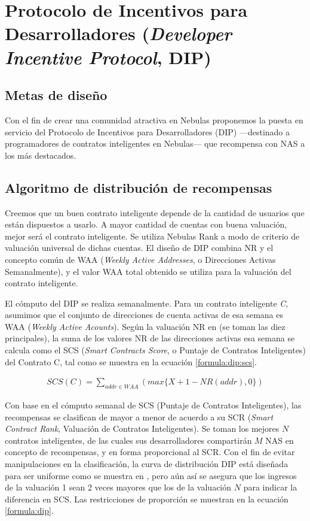 \section{Protocolo de Incentivos para Desarrolladores (\textit{Developer Incentive Protocol}, DIP)}
\label{sec:dip}

\subsection{Metas de diseño}
\label{dip:design}

Con el fin de crear una comunidad atractiva en Nebulas proponemos la puesta en servicio del Protocolo de Incentivos para Desarrolladores (DIP) —destinado a programadores de contratos inteligentes en Nebulas— que recompensa con NAS a los más destacados.

\subsection{Algoritmo de distribución de recompensas}
\label{dip:arith}

Creemos que un buen contrato inteligente depende de la cantidad de usuarios que están dispuestos a usarlo. A mayor cantidad de cuentas con buena valuación, mejor será el contrato inteligente. Se utiliza Nebulas Rank a modo de criterio de valuación universal de dichas cuentas. El diseño de DIP combina NR y el concepto común de WAA (\textit{Weekly Active Addresses}, o Direcciones Activas Semanalmente), y el valor WAA total obtenido se utiliza para la valuación del contrato inteligente.

El cómputo del DIP se realiza semanalmente. Para un contrato inteligente \textit{C}, asumimos que el conjunto de direcciones de cuenta activas de esa semana es WAA (\textit{Weekly Active Acounts}). Según la valuación NR en  (se toman las diez principales), la suma de los valores NR de las direcciones activas esa semana se calcula como el SCS (\textit{Smart Contracts Score}, o Puntaje de Contratos Inteligentes) del Contrato C, tal como se muestra en la ecuación \ref{formula:dip:scs}.

\begin{align}
\label{formula:dip:scs}
SCS(C)=\sum_{addr \in WAA}(max\{X + 1 - NR(addr), 0\})
\end{align}

Con base en el cómputo semanal de SCS (Puntaje de Contratos Inteligentes), las recompensas se clasifican de mayor a menor de acuerdo a su SCR (\textit{Smart Contract Rank}, Valuación de Contratos Inteligentes). Se toman los mejores $N$ contratos inteligentes, de las cuales sus desarrolladores compartirán $M$ NAS en concepto de recompensas, y en forma proporcional al SCR. Con el fin de evitar manipulaciones en la clasificación, la curva de distribución DIP está diseñada para ser uniforme como se muestra en , pero aún así se asegura que los ingresos de la valuación 1 sean 2 veces mayores que los de la valuación $N$ para indicar la diferencia en SCS. Las restricciones de proporción se muestran en la ecuación \ref{formula:dip}.

